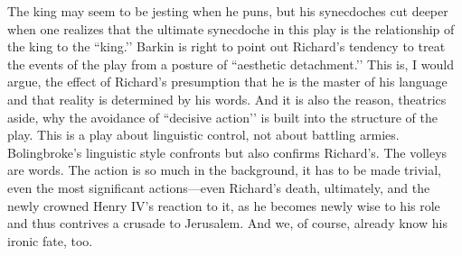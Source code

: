 The king may seem to be jesting when he puns, but his synecdoches cut deeper when one realizes that the ultimate synecdoche in this play is the relationship of the king to the ``king.’’ Barkin is right to point out Richard’s tendency to treat the events of the play from a posture of ``aesthetic detachment.’’ This is, I would argue, the effect of Richard’s presumption that he is the master of his language and that reality is determined by his words.
And it is also the reason, theatrics aside, why the avoidance of ``decisive action’’ is built into the structure of the play.
This is a play about linguistic control, not about battling armies.
Bolingbroke’s linguistic style confronts  but also confirms Richard’s.
The volleys are words.
The action is so much in the background, it has to be made trivial, even the most significant actions---even Richard’s death, ultimately, and the newly crowned Henry IV’s reaction to it, as he becomes newly wise to his role and thus contrives a crusade to Jerusalem.
And we, of course, already know his ironic fate, too.

